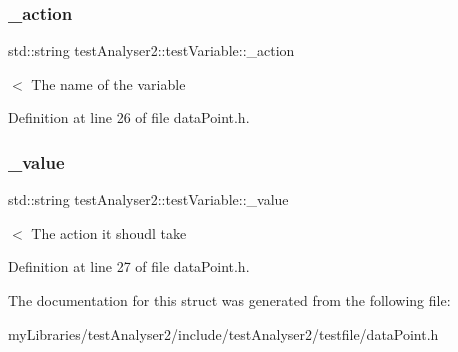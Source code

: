 \subsubsection{\texorpdfstring{\_action}{\_action}}
{\footnotesize\ttfamily std\+::string test\+Analyser2\+::test\+Variable\+::\+\_\+action}

$<$ The name of the variable 

Definition at line 26 of file data\+Point.\+h.

\mbox{\label{structtestAnalyser2_1_1testVariable_a667d6de717935ab634fde80d20279eda}} 
\subsubsection{\texorpdfstring{\_value}{\_value}}
{\footnotesize\ttfamily std\+::string test\+Analyser2\+::test\+Variable\+::\+\_\+value}

$<$ The action it shoudl take 

Definition at line 27 of file data\+Point.\+h.



The documentation for this struct was generated from the following file\+:\begin{DoxyCompactItemize}
\item 
my\+Libraries/test\+Analyser2/include/test\+Analyser2/testfile/data\+Point.\+h\end{DoxyCompactItemize}
